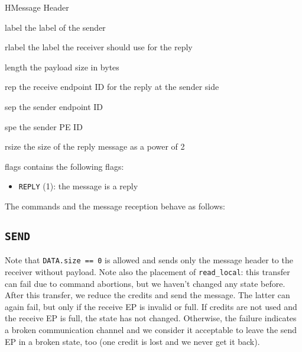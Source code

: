 \begin{register}{H}{Message Header}{}
  \regnewline%
  \regnewline%
  \begin{regdesc}\begin{reglist}
    \item[label] the label of the sender
    \item[rlabel] the label the receiver should use for the reply
    \item[length] the payload size in bytes
    \item[rep] the receive endpoint ID for the reply at the sender side
    \item[sep] the sender endpoint ID
    \item[spe] the sender PE ID
    \item[rsize] the size of the reply message as a power of 2
    \item[flags] contains the following flags:
    \begin{itemize}
      \item \texttt{REPLY} (1): the message is a reply
    \end{itemize}
  \end{reglist}\end{regdesc}
\end{register}

\noindent The commands and the message reception behave as follows:

\subsection{\texttt{SEND}}

Note that \texttt{DATA.size == 0} is allowed and sends only the message header to the receiver
without payload. Note also the placement of \texttt{read\_local}: this transfer can fail due to
command abortions, but we haven't changed any state before. After this transfer, we reduce the
credits and send the message. The latter can again fail, but only if the receive EP is invalid or
full. If credits are not used and the receive EP is full, the state has not changed. Otherwise, the
failure indicates a broken communication channel and we consider it acceptable to leave the send EP
in a broken state, too (one credit is lost and we never get it back).

